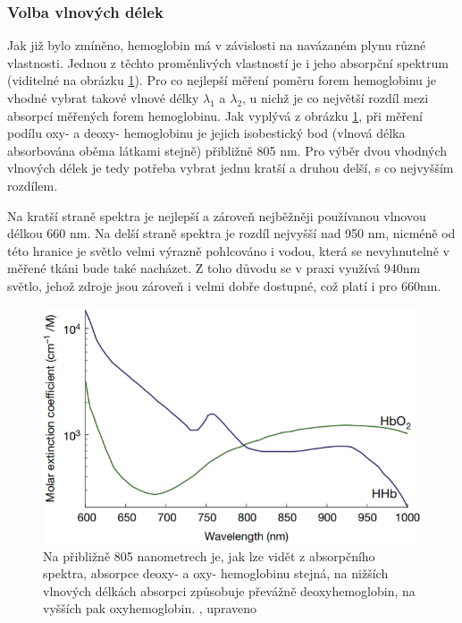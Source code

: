 \subsubsection{Volba vlnových délek}
Jak již bylo zmíněno, hemoglobin má v závislosti na navázaném plynu různé vlastnosti. Jednou z těchto proměnlivých vlastností je i jeho absorpční spektrum (viditelné na obrázku \ref{fig:Absorpce}). Pro co nejlepší měření poměru forem hemoglobinu je vhodné vybrat takové vlnové délky $\lambda_1$ a $\lambda_2$, u nichž je co největší rozdíl mezi absorpcí měřených forem hemoglobinu. Jak vyplývá z obrázku \ref{fig:Absorpce}, při měření podílu oxy- a deoxy- hemoglobinu je jejich isobestický bod (vlnová délka absorbována oběma látkami stejně) přibližně 805 nm. Pro výběr dvou vhodných vlnových délek je tedy potřeba vybrat jednu kratší a druhou delší, s co nejvyšším rozdílem.
\par Na kratší straně spektra je nejlepší a zároveň nejběžněji používanou vlnovou délkou 660 nm. Na delší straně spektra je rozdíl nejvyšší nad 950 nm, nicméně od této hranice je světlo velmi výrazně pohlcováno i vodou, která se nevyhnutelně v měřené tkáni bude také nacházet. Z toho důvodu se v praxi využívá 940nm světlo, jehož zdroje jsou zároveň i velmi dobře dostupné, což platí i pro 660nm. \citep{KYRIACOU}
\begin{figure}[ht]
  \includegraphics[scale=1, center]{Kapitoly/Teoreticka/Obrazky/Absorpce.png}
  \caption [Absorpční spektrum Hb a Hb$O_2$]{Na přibližně 805 nanometrech je, jak lze vidět z absorpčního spektra, absorpce deoxy- a oxy- hemoglobinu stejná, na nižších vlnových délkách absorpci způsobuje převážně deoxyhemoglobin, na vyšších pak oxyhemoglobin. \citep{KYRIACOU}, upraveno}
  \label{fig:Absorpce}
\end{figure}

